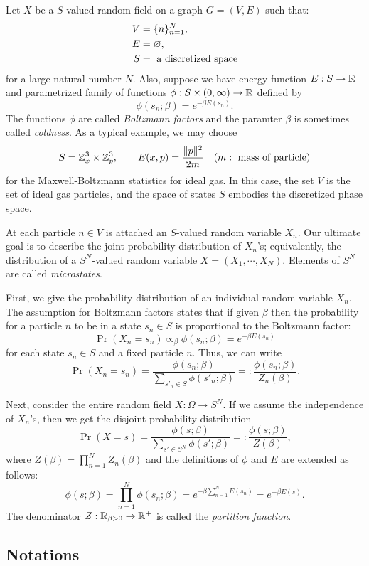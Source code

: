 \documentclass{../exp}
\begin{document}
\begin{ex}
Let $X$ be a $S$-valued random field on a graph $G=(V,E)$ such that:
\begin{align*}
V&=\{n\}_{n=1}^N,\\
E&=\varnothing,\\
S&=\text{ a discretized space}
\end{align*}
for a large natural number $N$.
Also, suppose we have energy function $E:S\to\R$ and parametrized family of functions $\phi:S\times(0,\infty)\to\R$ defined by
\[\phi(s_n;\beta)=e^{-\beta E(s_n)}.\]
The functions $\phi$ are called \emph{Boltzmann factors} and the paramter $\beta$ is sometimes called \emph{coldness}.
As a typical example, we may choose
\[S=\mathbb{Z}_x^3\times\mathbb{Z}_p^3,\qquad E(x,p)=\frac{\|p\|^2}{2m}\quad(m:\text{ mass of particle})\]
for the Maxwell-Boltzmann statistics for ideal gas.
In this case, the set $V$ is the set of ideal gas particles, and the space of states $S$ embodies the discretized phase space.

At each particle $n\in V$ is attached an $S$-valued random variable $X_n$.
Our ultimate goal is to describe the joint probability distribution of $X_n$'s; equivalently, the distribution of a $S^N$-valued random variable $X=(X_1,\cdots,X_N)$.
Elements of $S^N$ are called \emph{microstates}.

First, we give the probability distribution of an individual random variable $X_n$.
The assumption for Boltzmann factors states that if given $\beta$ then the probability for a particle $n$ to be in a state $s_n\in S$ is proportional to the Boltzmann factor: 
\[\Pr(X_n=s_n)\propto_\beta\phi(s_n;\beta)=e^{-\beta E(s_n)}\]
for each state $s_n\in S$ and a fixed particle $n$.
Thus, we can write
\[\Pr(X_n=s_n)=\frac{\phi(s_n;\beta)}{\sum_{s'_n\in S}\phi(s'_n;\beta)}=:\frac{\phi(s_n;\beta)}{Z_n(\beta)}.\]

Next, consider the entire random field $X:\Omega\to S^N$.
If we assume the independence of $X_n$'s, then we get the disjoint probability distribution
\[\Pr(X=s)=\frac{\phi(s;\beta)}{\sum_{s'\in S^N}\phi(s';\beta)}=:\frac{\phi(s;\beta)}{Z(\beta)},\]
where $Z(\beta)=\prod_{n=1}^NZ_n(\beta)$ and the definitions of $\phi$ and $E$ are extended as follows:
\[\phi(s;\beta)=\prod_{n=1}^N\phi(s_n;\beta)=e^{-\beta\sum_{n=1}^NE(s_n)}=e^{-\beta E(s)}.\]
The denominator $Z:\R_{\beta>0}\to\R^+$ is called the \emph{partition function}.
\end{ex}


\subsection{Notations}
\end{document}
